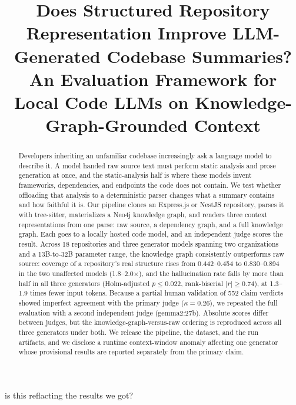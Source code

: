 is this reflacting the results we got?\documentclass[conference]{IEEEtran}
\begin{document}
\title{Does Structured Repository Representation Improve LLM-Generated Codebase Summaries?\\
\large An Evaluation Framework for Local Code LLMs on Knowledge-Graph-Grounded Context}

\author{
}

\maketitle

\begin{abstract}
Developers inheriting an unfamiliar codebase increasingly ask a language model to describe it.
A model handed raw source text must perform static analysis and prose generation at once, and
the static-analysis half is where these models invent frameworks, dependencies, and endpoints
the code does not contain. We test whether offloading that analysis to a deterministic parser
changes what a summary contains and how faithful it is. Our pipeline clones an Express.js or
NestJS repository, parses it with tree-sitter, materializes a Neo4j knowledge graph, and
renders three context representations from one parse: raw source, a dependency graph, and a
full knowledge graph. Each goes to a locally hosted code model, and an independent judge scores
the result. Across 18 repositories and three generator models spanning two organizations and a
13B-to-32B parameter range, the knowledge graph consistently outperforms raw source: coverage
of a repository's real structure rises from 0.442--0.454 to 0.830--0.894 in the two
unaffected models (1.8--2.0$\times$), and the hallucination rate falls by more than half in
all three generators (Holm-adjusted $p\le0.022$, rank-biserial $|r|\ge0.74$), at 1.3--1.9
times fewer input tokens. Because a partial human validation of 552 claim verdicts showed
imperfect agreement with the primary judge ($\kappa=0.26$), we repeated the full evaluation
with a second independent judge (gemma2:27b). Absolute scores differ between judges, but the
knowledge-graph-versus-raw ordering is reproduced across all three generators under both.
We release the pipeline, the dataset, and the run artifacts, and we disclose a runtime
context-window anomaly affecting one generator whose provisional results are reported
separately from the primary claim.
\end{abstract}
\end{document}
